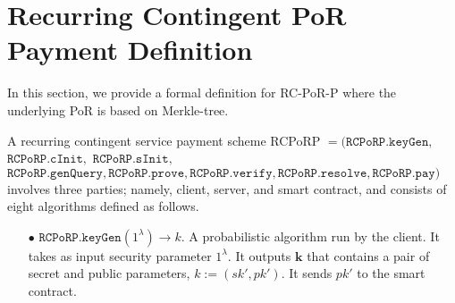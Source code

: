 
\section{Recurring Contingent PoR Payment Definition}\label{sec::RC-PoR-P-Definition}
In this section, we provide a formal definition for RC-PoR-P where the underlying PoR is based on Merkle-tree. 

\begin{definition}\label{RC-PoR-P-def}
A recurring contingent service payment scheme RCPoRP  $=(\mathtt{RCPoRP}.\mathtt{keyGen}, $ $\mathtt{RCPoRP}.\mathtt{cInit}, $ $\mathtt{RCPoRP}.\mathtt{sInit},  $ $\mathtt{RCPoRP}.\mathtt{genQuery},\mathtt{RCPoRP}.\mathtt{prove},\mathtt{RCPoRP}.\mathtt{verify},\mathtt{RCPoRP}.\mathtt{resolve},\mathtt{RCPoRP}.\mathtt{pay})$ involves three parties; namely, client, server,  and smart contract, and consists of eight algorithms defined as follows.


\begin{itemize}

\item[$\bullet$] $\mathtt{RCPoRP}.\mathtt{keyGen}(1^{\scriptscriptstyle\lambda})\rightarrow k$.  A probabilistic algorithm run by the client. It takes as input security parameter $1^{\scriptscriptstyle\lambda}$. It outputs $\bm{k}$ that contains a pair of secret and public parameters, $k:=(sk',pk')$. It sends  $pk'$ to the smart contract.

\


\end{itemize}
\end{definition}

